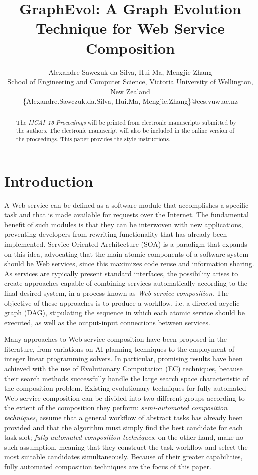 \documentclass{article}
\title{GraphEvol: A Graph Evolution Technique for Web Service Composition}
\author{Alexandre Sawczuk da Silva, Hui Ma, Mengjie Zhang\\ School of
Engineering and Computer Science, Victoria University of Wellington, New Zealand\\
\{Alexandre.Sawczuk.da.Silva, Hui.Ma, Mengjie.Zhang\}@ecs.vuw.ac.nz}
\begin{document}
\maketitle

\begin{abstract}
  The {\it IJCAI--15 Proceedings} will be printed from electronic
  manuscripts submitted by the authors. The electronic manuscript will
  also be included in the online version of the proceedings. This paper
  provides the style instructions.
\end{abstract}

\section{Introduction}

A Web service can be defined as a software module that accomplishes a specific task and that is made available for requests over
the Internet. The fundamental benefit of such modules is that they can be interwoven with new applications, preventing developers from rewriting
functionality that has already been implemented. Service-Oriented Architecture (SOA) is a paradigm that expands on this idea, advocating
that the main atomic components of a software system should be Web services, since this maximizes code reuse and information sharing.
As services are typically present standard interfaces, the possibility arises to create approaches capable of combining services
automatically according to the final desired system, in a process known as \textit{Web service composition}. The objective of these approaches
is to produce a workflow, i.e. a directed acyclic graph (DAG), stipulating the sequence in which each atomic service should be executed, as well as
the output-input connections between services.

Many approaches to Web service composition have been proposed in the literature, from variations on AI planning techniques to the employment
of integer linear programming solvers. In particular, promising results have been achieved with the use of Evolutionary Computation (EC) techniques,
because their search methods successfully handle the large search space characteristic of the composition problem. Existing evolutionary
techniques for fully automated Web service composition can be divided into two different groups according to the extent of the composition they
perform: \textit{semi-automated composition techniques}, assume that a general workflow of abstract tasks has already been provided and that the
algorithm must simply find the best candidate for each task slot; \textit{fully automated composition techniques}, on the other hand, make no such
assumption, meaning that they construct the task workflow and select the most suitable candidates simultaneously. Because of their greater capabilities,
fully automated composition techniques are the focus of this paper.
\end{document}
